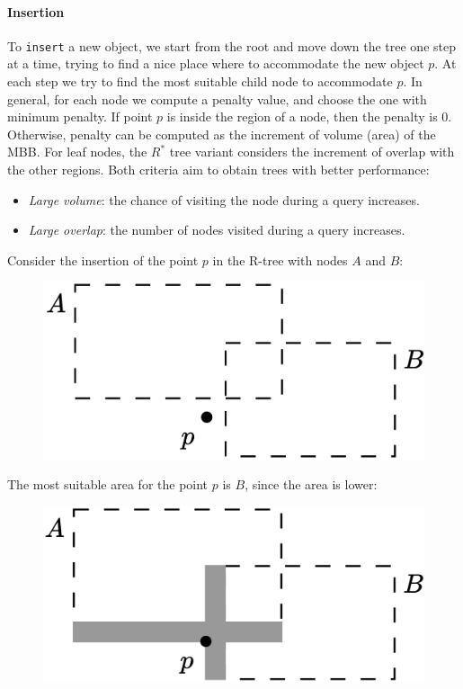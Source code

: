 \paragraph*{Insertion}
To \texttt{insert} a new object, we start from the root and move down the tree one step at a time, trying to find a nice place where to accommodate the new object $p$. 
At each step we try to find the most suitable child node to accommodate $p$. 
In general, for each node we compute a penalty value, and choose the one with minimum penalty.
If point $p$ is inside the region of a node, then the penalty is 0. 
Otherwise, penalty can be computed as the increment of volume (area) of the MBB. 
For leaf nodes, the $R^{*}$ tree variant considers the increment of overlap with the other regions. 
Both criteria aim to obtain trees with better performance:
\begin{itemize}
    \item \textit{Large volume}: the chance of visiting the node during a query increases.
    \item \textit{Large overlap}: the number of nodes visited during a query increases.
\end{itemize}
\begin{example}
    Consider the insertion of the point $p$ in the R-tree with nodes $A$ and $B$: 
    \begin{figure}[H]
        \centering
        \includegraphics[width=0.4\linewidth]{images/r1.png}
    \end{figure}
    The most suitable area for the point $p$ is $B$, since the area is lower: 
    \begin{figure}[H]
        \centering
        \includegraphics[width=0.4\linewidth]{images/r2.png}
    \end{figure}
\end{example}

